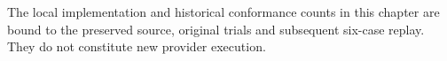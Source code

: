

\par The local implementation and historical conformance counts in this chapter are bound to the preserved source, original trials and subsequent six-case replay. They do not constitute new provider execution.\cite{exec14_l6_local}
\label{exec14:l6-end}

